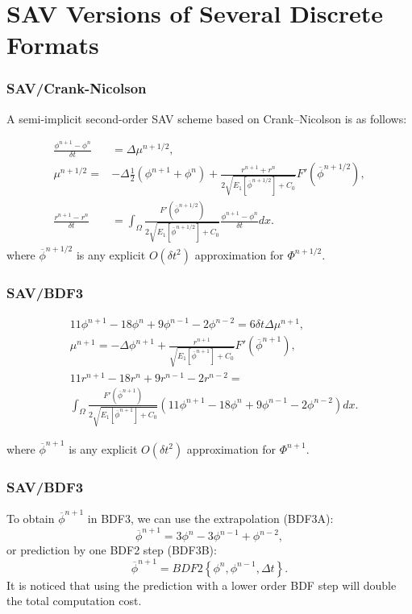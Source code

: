 \documentclass{beamer}
\begin{document}
\section{SAV Versions of Several Discrete Formats}
    \begin{frame}
\frametitle{SAV/Crank-Nicolson}

A semi-implicit second-order SAV scheme based on Crank–Nicolson is as follows:

\begin{equation}\label{SAV-CN}
  \begin{split}
\frac{\phi^{n+1}-\phi^n}{\delta t}&=\Delta\mu^{n+1/2},\\
\mu^{n+1/2}=&-\Delta\frac{1}{2}(\phi^{n+1}+\phi^n)+\frac{r^{n+1}+r^n}{2\sqrt{E_1[\overline{\phi}^{n+1/2}]+C_0}}F'(\overline{\phi}^{n+1/2}),\\
\frac{r^{n+1}-r^n}{\delta t}&=\int_{\Omega}\frac{F'(\overline{\phi}^{n+1/2})}{2\sqrt{E_1[\overline{\phi}^{n+1/2}]+C_0}}\frac{\phi^{n+1}-\phi^n}{\delta t} dx.
  \end{split}
\end{equation}
where $\overline{\phi}^{n+1/2}$ is any explicit $O(\delta t^2)$ approximation for $\Phi^{n+1/2}$.

    \end{frame}
    
    \begin{frame}
\frametitle{SAV/BDF3}
    
    \begin{equation}\label{SAV-BDF3}
  \begin{split}
&11\phi^{n+1}-18\phi^n+9\phi^{n-1}-2\phi^{n-2}=6\delta t\Delta\mu^{n+1},\\
&\mu^{n+1}=-\Delta\phi^{n+1}+\frac{r^{n+1}}{\sqrt{E_1[\overline{\phi}^{n+1}]+C_0}}F'(\overline{\phi}^{n+1}),\\
&11r^{n+1}-18r^n+9r^{n-1}-2r^{n-2}=\\
&\int_{\Omega}\frac{F'(\overline{\phi}^{n+1})}{2\sqrt{E_1[\overline{\phi}^{n+1}]+C_0}}(11\phi^{n+1}-18\phi^n+9\phi^{n-1}-2\phi^{n-2})dx.
  \end{split}
\end{equation}

where $\overline{\phi}^{n+1}$ is any explicit $O(\delta t^2)$ approximation for $\Phi^{n+1}$.
    \end{frame}
    
    \begin{frame}
\frametitle{SAV/BDF3}

    To obtain $\overline{\phi}^{n+1}$ in BDF3, we can use the extrapolation (BDF3A):
    $$
    \overline{\phi}^{n+1}=3\phi^n-3\phi^{n-1}+\phi^{n-2},
    $$
    or prediction by one BDF2 step (BDF3B):
    $$
    \overline{\phi}^{n+1}=BDF2\left\{\phi^n,\phi^{n-1},\Delta t\right\}.
    $$
    It is noticed that using the prediction with a lower order BDF step will double the total
computation cost.
    \end{frame}
\end{document}
